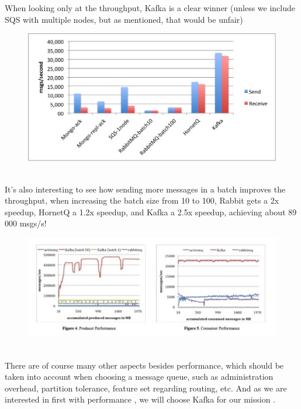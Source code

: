 When looking only at the throughput, Kafka is a clear winner
 (unless we include SQS with multiple nodes, but as mentioned, that would be unfair)
  \begin{figure}[h!]
	\centering
	\includegraphics[height=0.3\textheight]{fig01/kafkaBenshMark}
	\label{fig:FilialesEtClients}
\end{figure}\\
It's also interesting to see how sending more messages in a batch improves the throughput, when increasing the batch size from 10 to 100, Rabbit gets a 2x speedup, HornetQ a 1.2x speedup, and Kafka a 2.5x speedup, achieving about 89 000 msgs/s!
  \begin{figure}[h!]
	\centering
	\includegraphics[height=0.3\textheight]{fig01/MQPerformance}
	\label{fig:FilialesEtClients}
\end{figure}\\
There are of course many other aspects besides performance, 
which should be taken into account when choosing a message queue, 
such as administration overhead, partition tolerance, feature set regarding routing, etc.
And as we are interested in first with performance , we will choose Kafka for our mission .
